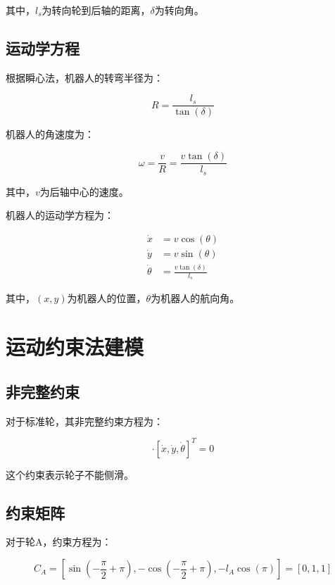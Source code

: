 \documentclass[12pt,a4paper]{report}
\begin{document}
其中，$l_s$为转向轮到后轴的距离，$\delta$为转向角。

\subsection{运动学方程}

根据瞬心法，机器人的转弯半径为：

\begin{equation}
R = \frac{l_s}{\tan(\delta)}
\end{equation}

机器人的角速度为：

\begin{equation}
\omega = \frac{v}{R} = \frac{v \tan(\delta)}{l_s}
\end{equation}

其中，$v$为后轴中心的速度。

机器人的运动学方程为：

\begin{align}
\dot{x} &= v \cos(\theta) \\
\dot{y} &= v \sin(\theta) \\
\dot{\theta} &= \frac{v \tan(\delta)}{l_s}
\end{align}

其中，$(x, y)$为机器人的位置，$\theta$为机器人的航向角。

\section{运动约束法建模}

\subsection{非完整约束}

对于标准轮，其非完整约束方程为：

\begin{equation}
[\sin(\alpha+\beta), -\cos(\alpha+\beta), -l\cos(\beta)] \cdot [\dot{x}, \dot{y}, \dot{\theta}]^T = 0
\end{equation}

这个约束表示轮子不能侧滑。

\subsection{约束矩阵}

对于轮A，约束方程为：

\begin{equation}
C_A = [\sin(-\frac{\pi}{2}+\pi), -\cos(-\frac{\pi}{2}+\pi), -l_A\cos(\pi)] = [0, 1, 1]
\end{equation}
\end{document}
